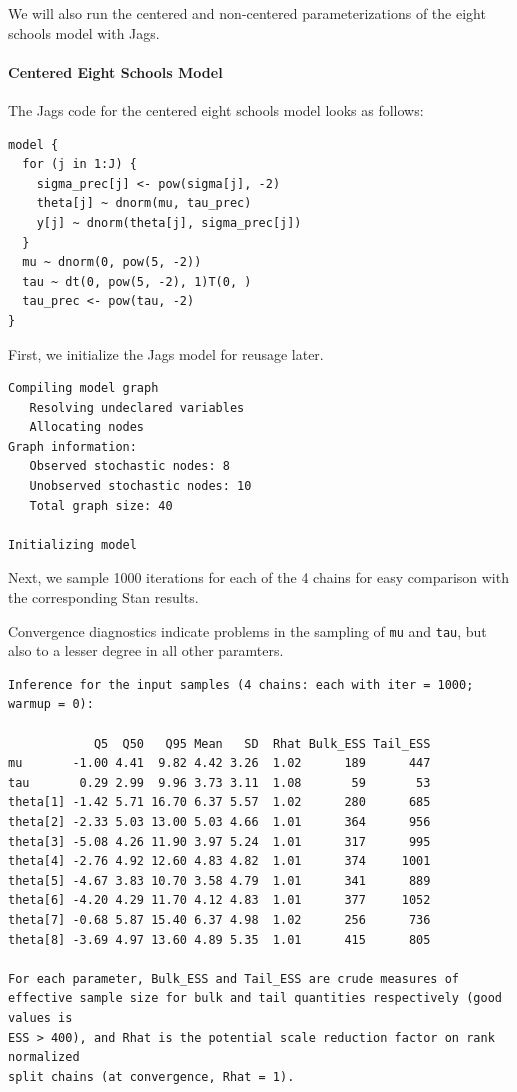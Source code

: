 \documentclass[american,]{article}
\let\oldparagraph\paragraph
\renewcommand{\paragraph}[1]{\oldparagraph{#1}\mbox{}}
\begin{document}
We will also run the centered and non-centered parameterizations of the
eight schools model with Jags.

\hypertarget{centered-eight-schools-model-1}{%
\paragraph{Centered Eight Schools
Model}\label{centered-eight-schools-model-1}}

The Jags code for the centered eight schools model looks as follows:

\begin{verbatim}
model {
  for (j in 1:J) {
    sigma_prec[j] <- pow(sigma[j], -2)
    theta[j] ~ dnorm(mu, tau_prec)
    y[j] ~ dnorm(theta[j], sigma_prec[j])
  }
  mu ~ dnorm(0, pow(5, -2))
  tau ~ dt(0, pow(5, -2), 1)T(0, )
  tau_prec <- pow(tau, -2)
}
\end{verbatim}

First, we initialize the Jags model for reusage later.

\begin{verbatim}
Compiling model graph
   Resolving undeclared variables
   Allocating nodes
Graph information:
   Observed stochastic nodes: 8
   Unobserved stochastic nodes: 10
   Total graph size: 40

Initializing model
\end{verbatim}

Next, we sample 1000 iterations for each of the 4 chains for easy
comparison with the corresponding Stan results.

Convergence diagnostics indicate problems in the sampling of \texttt{mu}
and \texttt{tau}, but also to a lesser degree in all other paramters.

\begin{verbatim}
Inference for the input samples (4 chains: each with iter = 1000; warmup = 0):

            Q5  Q50   Q95 Mean   SD  Rhat Bulk_ESS Tail_ESS
mu       -1.00 4.41  9.82 4.42 3.26  1.02      189      447
tau       0.29 2.99  9.96 3.73 3.11  1.08       59       53
theta[1] -1.42 5.71 16.70 6.37 5.57  1.02      280      685
theta[2] -2.33 5.03 13.00 5.03 4.66  1.01      364      956
theta[3] -5.08 4.26 11.90 3.97 5.24  1.01      317      995
theta[4] -2.76 4.92 12.60 4.83 4.82  1.01      374     1001
theta[5] -4.67 3.83 10.70 3.58 4.79  1.01      341      889
theta[6] -4.20 4.29 11.70 4.12 4.83  1.01      377     1052
theta[7] -0.68 5.87 15.40 6.37 4.98  1.02      256      736
theta[8] -3.69 4.97 13.60 4.89 5.35  1.01      415      805

For each parameter, Bulk_ESS and Tail_ESS are crude measures of 
effective sample size for bulk and tail quantities respectively (good values is 
ESS > 400), and Rhat is the potential scale reduction factor on rank normalized
split chains (at convergence, Rhat = 1).
\end{verbatim}
\end{document}
